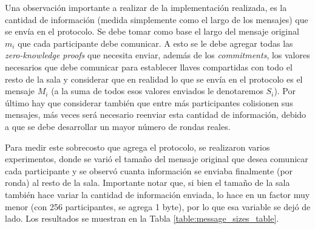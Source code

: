 Una observación importante a realizar de la implementación realizada, es la 
cantidad de información (medida simplemente como el largo de los mensajes) que 
se envía en el protocolo. Se debe tomar como base el largo del mensaje 
original $m_i$ que cada participante debe comunicar. A esto se le debe agregar 
todas las \emph{zero-knowledge proofs} que necesita enviar, además de los \emph
{commitments}, los valores necesarios que debe comunicar para establecer 
llaves compartidas con todo el resto de la sala y considerar que en realidad 
lo que se envía en el protocolo es el mensaje $M_i$ (a la suma de todos esos 
valores enviados le denotaremos $S_i$). Por último hay que considerar también 
que entre más participantes colisionen sus mensajes, más veces será necesario 
reenviar esta cantidad de información, debido a que se debe desarrollar un 
mayor número de rondas reales.

Para medir este sobrecosto que agrega el protocolo, se realizaron varios 
experimentos, donde se varió el tamaño del mensaje original que desea 
comunicar cada participante y se observó cuanta información se enviaba 
finalmente (por ronda) al resto de la sala. Importante notar que, si bien el 
tamaño de la sala también hace variar la cantidad de información enviada, lo 
hace en un factor muy menor (con 256 participantes, se agrega 1 byte), por lo 
que esa variable se dejó de lado. Los resultados se muestran en la Tabla \ref{table:message_sizes_table}.


